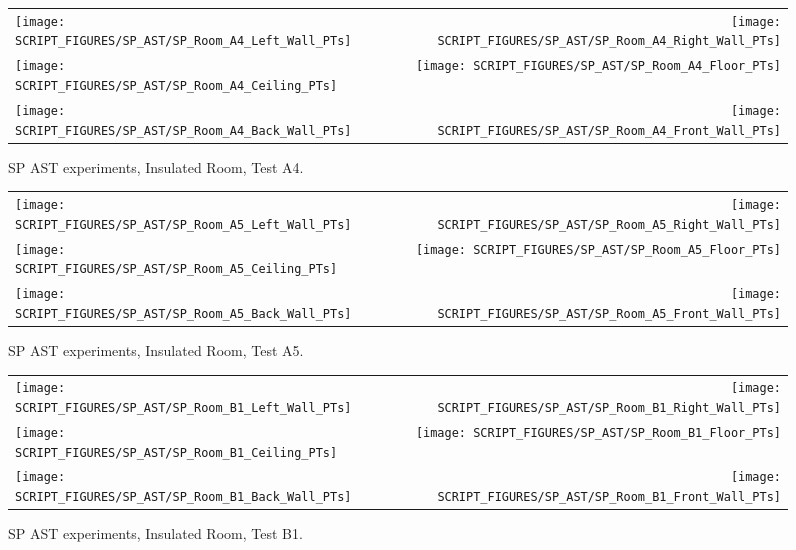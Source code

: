 \begin{figure}[p]
\begin{tabular*}{\textwidth}{l@{\extracolsep{\fill}}r}
\texttt{[image: SCRIPT\_FIGURES/SP\_AST/SP\_Room\_A4\_Left\_Wall\_PTs]} &  \texttt{[image: SCRIPT\_FIGURES/SP\_AST/SP\_Room\_A4\_Right\_Wall\_PTs]}  \\
\texttt{[image: SCRIPT\_FIGURES/SP\_AST/SP\_Room\_A4\_Ceiling\_PTs]}   &  \texttt{[image: SCRIPT\_FIGURES/SP\_AST/SP\_Room\_A4\_Floor\_PTs]}  \\
\texttt{[image: SCRIPT\_FIGURES/SP\_AST/SP\_Room\_A4\_Back\_Wall\_PTs]} &  \texttt{[image: SCRIPT\_FIGURES/SP\_AST/SP\_Room\_A4\_Front\_Wall\_PTs]}
\end{tabular*}
\caption{SP AST experiments, Insulated Room, Test A4.}
\label{SP_Room_A4_PTs}
\end{figure}

\begin{figure}[p]
\begin{tabular*}{\textwidth}{l@{\extracolsep{\fill}}r}
\texttt{[image: SCRIPT\_FIGURES/SP\_AST/SP\_Room\_A5\_Left\_Wall\_PTs]} &  \texttt{[image: SCRIPT\_FIGURES/SP\_AST/SP\_Room\_A5\_Right\_Wall\_PTs]}  \\
\texttt{[image: SCRIPT\_FIGURES/SP\_AST/SP\_Room\_A5\_Ceiling\_PTs]}   &  \texttt{[image: SCRIPT\_FIGURES/SP\_AST/SP\_Room\_A5\_Floor\_PTs]}  \\
\texttt{[image: SCRIPT\_FIGURES/SP\_AST/SP\_Room\_A5\_Back\_Wall\_PTs]} &  \texttt{[image: SCRIPT\_FIGURES/SP\_AST/SP\_Room\_A5\_Front\_Wall\_PTs]}
\end{tabular*}
\caption{SP AST experiments, Insulated Room, Test A5.}
\label{SP_Room_A5_PTs}
\end{figure}

\begin{figure}[p]
\begin{tabular*}{\textwidth}{l@{\extracolsep{\fill}}r}
\texttt{[image: SCRIPT\_FIGURES/SP\_AST/SP\_Room\_B1\_Left\_Wall\_PTs]} &  \texttt{[image: SCRIPT\_FIGURES/SP\_AST/SP\_Room\_B1\_Right\_Wall\_PTs]}  \\
\texttt{[image: SCRIPT\_FIGURES/SP\_AST/SP\_Room\_B1\_Ceiling\_PTs]}   &  \texttt{[image: SCRIPT\_FIGURES/SP\_AST/SP\_Room\_B1\_Floor\_PTs]}  \\
\texttt{[image: SCRIPT\_FIGURES/SP\_AST/SP\_Room\_B1\_Back\_Wall\_PTs]} &  \texttt{[image: SCRIPT\_FIGURES/SP\_AST/SP\_Room\_B1\_Front\_Wall\_PTs]}
\end{tabular*}
\caption{SP AST experiments, Insulated Room, Test B1.}
\label{SP_Room_B1_PTs}
\end{figure}


